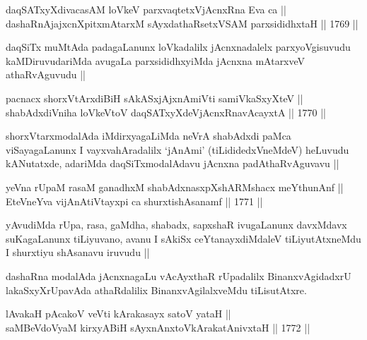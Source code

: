 \begin{shl}
daqSATxyXdivacasAM loVkeV parxvaqtetxVjAcnxRna Eva ca ||  \\
dashaRnAjajxcnXpitxmAtarxM sAyxdathaRsetxVSAM parxsididhxtaH ||  1769 ||  
\end{shl}

\begin{artha}
daqSiTx muMtAda padagaLanunx loVkadalilx jAcnxnadalelx parxyoVgisuvudu
kaMDiruvudariMda avugaLa parxsididhxyiMda jAcnxna mAtarxveV
athaRvAguvudu ||
\end{artha}


\begin{shl}
pacnacx shorxVtArxdiBiH sAkASxjAjxnAmiVti samiVkaSxyXteV || \\
shabAdxdiVniha loVkeV\s toV daqSATxyXdeVjAcnxRnavAcayxtA ||  1770 ||  
\end{shl}

\begin{artha}
shorxVtarxmodalAda iMdirxyagaLiMda neVrA shabAdxdi paMca
viSayagaLanunx I vayxvahAradalilx `jAnAmi' (tiLididedxVneMdeV)
heLuvudu kANutatxde, adariMda daqSiTxmodalAdavu jAcnxna
padAthaRvAguvavu ||
\end{artha}


\begin{shl}
yeVna rUpaM rasaM ganadhxM shabAdxnasxpXshARMshacx meYthunAnf || \\
EteVneYva vijAnAtiVtayxpi ca shurxtishAsanamf ||  1771 ||  
\end{shl}

\begin{artha}
yAvudiMda rUpa, rasa, gaMdha, shabadx, sapxshaR ivugaLanunx davxMdavx
suKagaLanunx tiLiyuvano, avanu I sAkiSx ceYtanayxdiMdaleV
tiLiyutAtxneMdu I shurxtiyu shAsanavu iruvudu ||
\end{artha}

\begin{artha}
dashaRna modalAda jAcnxnagaLu vAcAyxthaR rUpadalilx BinanxvAgidadxrU
lakaSxyXrUpavAda athaRdalilix BinanxvAgilalxveMdu tiLisutAtxre.
\end{artha}

\begin{shl}
lAvakaH pAcakoV veVti kArakasayx satoV yataH || \\
saMBeVdoV\s yaM kirxyABiH sAyxnAnxtoV\s kArakatAnivxtaH ||  1772 ||  
\end{shl}

